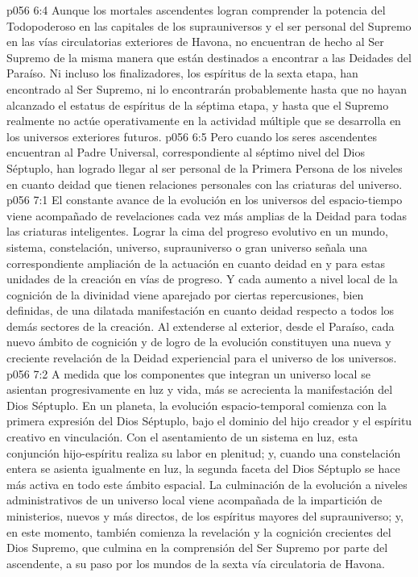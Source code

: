 \vs p056 6:4 Aunque los mortales ascendentes logran comprender la potencia del Todopoderoso en las capitales de los suprauniversos y el ser personal del Supremo en las vías circulatorias exteriores de Havona, no encuentran de hecho al Ser Supremo de la misma manera que están destinados a encontrar a las Deidades del Paraíso. Ni incluso los finalizadores, los espíritus de la sexta etapa, han encontrado al Ser Supremo, ni lo encontrarán probablemente hasta que no hayan alcanzado el estatus de espíritus de la séptima etapa, y hasta que el Supremo realmente no actúe operativamente en la actividad múltiple que se desarrolla en los universos exteriores futuros.
\vs p056 6:5 Pero cuando los seres ascendentes encuentran al Padre Universal, correspondiente al séptimo nivel del Dios Séptuplo, han logrado llegar al ser personal de la Primera Persona de  los niveles en cuanto deidad que tienen relaciones personales con las criaturas del universo.
\vs p056 7:1 El constante avance de la evolución en los universos del espacio\hyp{}tiempo viene acompañado de revelaciones cada vez más amplias de la Deidad para todas las criaturas inteligentes. Lograr la cima del progreso evolutivo en un mundo, sistema, constelación, universo, suprauniverso o gran universo señala una correspondiente ampliación de la actuación en cuanto deidad en y para estas unidades de la creación en vías de progreso. Y cada aumento a nivel local de la cognición de la divinidad viene aparejado por ciertas repercusiones, bien definidas, de una dilatada manifestación en cuanto deidad respecto a todos los demás sectores de la creación. Al extenderse al exterior, desde el Paraíso, cada nuevo ámbito de cognición y de logro de la evolución constituyen una nueva y creciente revelación de la Deidad experiencial para el universo de los universos.
\vs p056 7:2 A medida que los componentes que integran un universo local se asientan progresivamente en luz y vida, más se acrecienta la manifestación del Dios Séptuplo. En un planeta, la evolución espacio\hyp{}temporal comienza con la primera expresión del Dios Séptuplo, bajo el dominio del hijo creador y el espíritu creativo en vinculación. Con el asentamiento de un sistema en luz, esta conjunción hijo\hyp{}espíritu realiza su labor en plenitud; y, cuando una constelación entera se asienta igualmente en luz, la segunda faceta del Dios Séptuplo se hace más activa en todo este ámbito espacial. La culminación de la evolución a niveles administrativos de un universo local viene acompañada de la impartición de ministerios, nuevos y más directos, de los espíritus mayores del suprauniverso; y, en este momento, también comienza la revelación y la cognición crecientes del Dios Supremo, que culmina en la comprensión del Ser Supremo por parte del ascendente, a su paso por los mundos de la sexta vía circulatoria de Havona.
